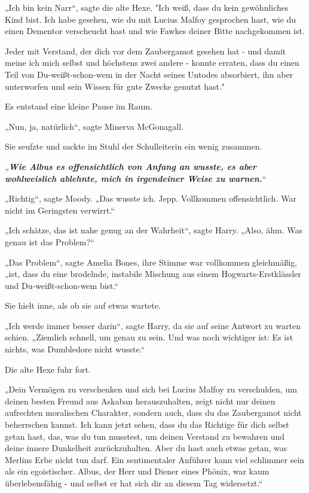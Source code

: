 {„Ich bin kein Narr“, sagte die alte Hexe. "Ich weiß, dass du kein gewöhnliches Kind bist. Ich habe gesehen, wie du mit Lucius Malfoy gesprochen hast, wie du einen Dementor verscheucht hast und wie Fawkes deiner Bitte nachgekommen ist.

Jeder mit Verstand, der dich vor dem Zaubergamot gesehen hat - und damit meine ich mich selbst und höchstens zwei andere - konnte erraten, dass du einen Teil von Du-weißt-schon-wem in der Nacht seines Untodes absorbiert, ihn aber unterworfen und sein Wissen für gute Zwecke genutzt hast."

Es entstand eine kleine Pause im Raum.

„Nun, ja, natürlich“, sagte Minerva McGonagall.

Sie seufzte und sackte im Stuhl der Schulleiterin ein wenig zusammen.

„\textbf{\emph{Wie Albus es offensichtlich von Anfang an wusste, es aber wohlweislich ablehnte, mich in irgendeiner Weise zu warnen.}}“

„Richtig“, sagte Moody. „Das wusste ich. Jepp. Vollkommen offensichtlich. War nicht im Geringsten verwirrt.“

„Ich schätze, das ist nahe genug an der Wahrheit“, sagte Harry. „Also, ähm. Was genau ist das Problem?“

„Das Problem“, sagte Amelia Bones, ihre Stimme war vollkommen gleichmäßig, „ist, dass du eine brodelnde, instabile Mischung aus einem Hogwarts-Erstklässler und Du-weißt-schon-wem bist.“

Sie hielt inne, als ob sie auf etwas wartete.

„Ich werde immer besser darin“, sagte Harry, da sie auf seine Antwort zu warten schien. „Ziemlich schnell, um genau zu sein. Und was noch wichtiger ist: Es ist nichts, was Dumbledore nicht wusste.“

Die alte Hexe fuhr fort.

„Dein Vermögen zu verschenken und sich bei Lucius Malfoy zu verschulden, um deinen besten Freund aus Askaban herauszuhalten, zeigt nicht nur deinen aufrechten moralischen Charakter, sondern auch, dass du das Zaubergamot nicht beherrschen kannst. Ich kann jetzt sehen, dass du das Richtige für dich selbst getan hast, das, was du tun musstest, um deinen Verstand zu bewahren und deine innere Dunkelheit zurückzuhalten. Aber du hast auch etwas getan, was Merlins Erbe nicht tun darf. Ein sentimentaler Anführer kann viel schlimmer sein als ein egoistischer. Albus, der Herr und Diener eines Phönix, war kaum überlebensfähig - und selbst er hat sich dir an diesem Tag widersetzt.“

}
